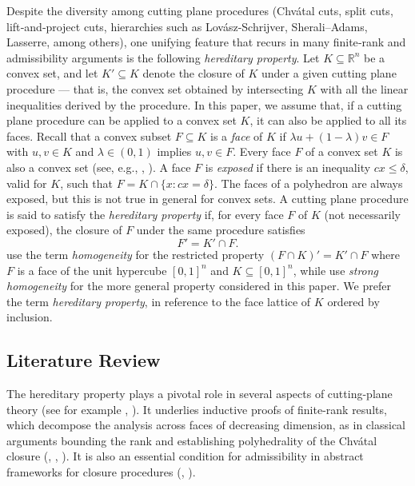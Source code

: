 \documentclass{article}
\newcommand{\R}{\mathbb{R}}
\begin{document}
Despite the diversity among cutting plane procedures (Chv\'atal cuts, split cuts, lift‐and‐project cuts, hierarchies such as Lov\'asz‐Schrijver, Sherali–Adams, Lasserre, among others), one unifying feature that recurs in many finite‐rank and admissibility arguments is the following \emph{hereditary property}. Let $K \subseteq \R^n$ be a convex set, and let $K' \subseteq K$ denote the closure of $K$ under a given cutting plane procedure — that is, the convex set obtained by intersecting $K$ with all the linear inequalities derived by the procedure. In this paper, we assume that, if a cutting plane procedure can be applied to a convex set $K$, it can also be applied to all its faces. Recall that a convex subset $F \subseteq K$ is a \emph{face} of $K$ if $\lambda u + (1-\lambda) v \in F$ with $u, v \in K$ and $\lambda \in (0,1)$ implies $u, v \in F$. Every face $F$ of a convex set $K$ is also a convex set (see, e.g., \cite{rockafellar1970convex}, \cite{hiriart2004fundamentals}). A face $F$ is \emph{exposed} if there is an inequality $c x \leq \delta$, valid for $K$, such that $F = K \cap \{x : c x = \delta\}$. The faces of a polyhedron are always exposed, but this is not true in general for convex sets. A cutting plane procedure is said to satisfy the {\it hereditary property} if, for every face $F$ of $K$ (not necessarily exposed), the closure of $F$ under the same procedure satisfies
$$F' = K' \cap F.$$
 \cite{pokutta2010rank} use the term \emph{homogeneity} for the restricted property $(F \cap K)' = K' \cap F$ where $F$ is a face of the unit hypercube $[0,1]^n$ and $K \subseteq [0,1]^n$, while \cite{dey2014design} use \emph{strong homogeneity} for the more general property considered in this paper. We prefer the term \emph{hereditary property}, in reference to the face lattice of $K$ ordered by inclusion.

\subsection{Literature Review} \label{subsec:lit-review}

The hereditary property plays a pivotal role in several aspects of cutting-plane theory (see for example \cite{schrijver1986theory}, \cite{cook1990chvatal}). It underlies inductive proofs of finite-rank results, which decompose the analysis across faces of decreasing dimension, as in classical arguments bounding the rank and establishing polyhedrality of the Chv\'atal closure (\cite{chvatal1973edmonds}, \cite{dunkel2013gomory}, \cite{dadush2014chvatal}). It is also an essential condition for admissibility in abstract frameworks for closure procedures (\cite{pokutta2010rank}, \cite{dey2014design}).
\end{document}
